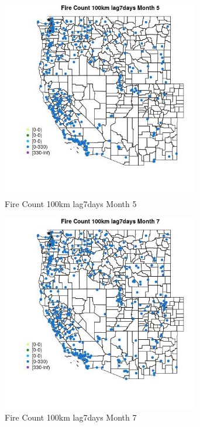 \begin{figure} 
\centering  
\includegraphics[width=0.77\textwidth]{Code_Outputs/Report_ML_input_PM25_Step4_part_e_de_duplicated_aves_compiled_2019-05-18wNAs_MapObsMo5Fire_Count_100km_lag7days.jpg} 
\caption{\label{fig:Report_ML_input_PM25_Step4_part_e_de_duplicated_aves_compiled_2019-05-18wNAsMapObsMo5Fire_Count_100km_lag7days}Fire Count 100km lag7days Month 5} 
\end{figure} 
 

\begin{figure} 
\centering  
\includegraphics[width=0.77\textwidth]{Code_Outputs/Report_ML_input_PM25_Step4_part_e_de_duplicated_aves_compiled_2019-05-18wNAs_MapObsMo7Fire_Count_100km_lag7days.jpg} 
\caption{\label{fig:Report_ML_input_PM25_Step4_part_e_de_duplicated_aves_compiled_2019-05-18wNAsMapObsMo7Fire_Count_100km_lag7days}Fire Count 100km lag7days Month 7} 
\end{figure} 
 

